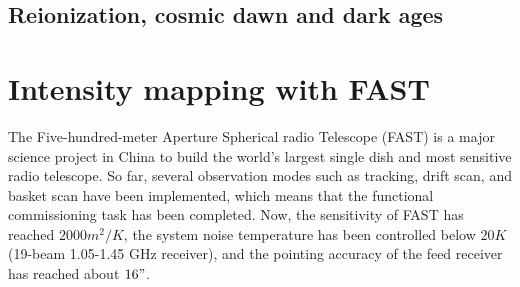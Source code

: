 \documentclass{article}
\begin{document}
\subsection{Reionization, cosmic dawn and dark ages}

\section{Intensity mapping with FAST}
The Five-hundred-meter Aperture Spherical radio Telescope (FAST) is a major science project in China to build the world's largest single dish and most sensitive radio telescope. So far, several observation modes such as tracking, drift scan, and basket scan have been implemented, which means that the functional commissioning task has been completed. Now, the sensitivity of FAST has reached $2000 m^2/K$, the system noise temperature has been controlled below $20K$ (19-beam 1.05-1.45 GHz receiver), and the pointing accuracy of the feed receiver has reached about $16"$. 
\end{document}
